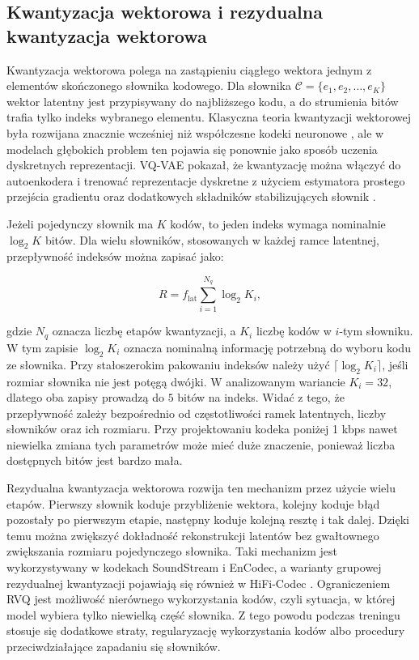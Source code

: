 \subsection{Kwantyzacja wektorowa i rezydualna kwantyzacja wektorowa}
\label{subsec:kwantyzacja-wektorowa-rvq}

Kwantyzacja wektorowa polega na zastąpieniu ciągłego wektora jednym z elementów skończonego słownika kodowego. Dla słownika \(\mathcal{C} = \{e_1, e_2, \ldots, e_K\}\) wektor latentny jest przypisywany do najbliższego kodu, a do strumienia bitów trafia tylko indeks wybranego elementu. Klasyczna teoria kwantyzacji wektorowej była rozwijana znacznie wcześniej niż współczesne kodeki neuronowe \cite{Gray1984VectorQuantization}, ale w modelach głębokich problem ten pojawia się ponownie jako sposób uczenia dyskretnych reprezentacji. VQ-VAE pokazał, że kwantyzację można włączyć do autoenkodera i trenować reprezentacje dyskretne z użyciem estymatora prostego przejścia gradientu oraz dodatkowych składników stabilizujących słownik \cite{VanDenOord2017NeuralDiscrete}.

Jeżeli pojedynczy słownik ma \(K\) kodów, to jeden indeks wymaga nominalnie \(\log_2 K\) bitów. Dla wielu słowników, stosowanych w każdej ramce latentnej, przepływność indeksów można zapisać jako:

\begin{equation}
    R = f_{\mathrm{lat}} \sum_{i=1}^{N_q} \log_2 K_i,
\end{equation}

gdzie \(N_q\) oznacza liczbę etapów kwantyzacji, a \(K_i\) liczbę kodów w \(i\)-tym słowniku. W tym zapisie \(\log_2 K_i\) oznacza nominalną informację potrzebną do wyboru kodu ze słownika. Przy stałoszerokim pakowaniu indeksów należy użyć \(\lceil \log_2 K_i \rceil\), jeśli rozmiar słownika nie jest potęgą dwójki. W analizowanym wariancie \(K_i=32\), dlatego oba zapisy prowadzą do \(5\) bitów na indeks. Widać z tego, że przepływność zależy bezpośrednio od częstotliwości ramek latentnych, liczby słowników oraz ich rozmiaru. Przy projektowaniu kodeka poniżej 1 kbps nawet niewielka zmiana tych parametrów może mieć duże znaczenie, ponieważ liczba dostępnych bitów jest bardzo mała.

Rezydualna kwantyzacja wektorowa rozwija ten mechanizm przez użycie wielu etapów. Pierwszy słownik koduje przybliżenie wektora, kolejny koduje błąd pozostały po pierwszym etapie, następny koduje kolejną resztę i tak dalej. Dzięki temu można zwiększyć dokładność rekonstrukcji latentów bez gwałtownego zwiększania rozmiaru pojedynczego słownika. Taki mechanizm jest wykorzystywany w kodekach SoundStream i EnCodec, a warianty grupowej rezydualnej kwantyzacji pojawiają się również w HiFi-Codec \cite{Zeghidour2021SoundStream,Defossez2022Encodec,Yang2023HiFiCodec}. Ograniczeniem RVQ jest możliwość nierównego wykorzystania kodów, czyli sytuacja, w której model wybiera tylko niewielką część słownika. Z tego powodu podczas treningu stosuje się dodatkowe straty, regularyzację wykorzystania kodów albo procedury przeciwdziałające zapadaniu się słowników.


